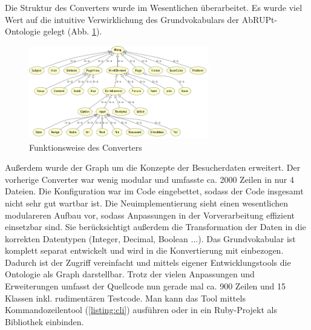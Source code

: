 \documentclass[runningheads,a4paper]{llncs}
\begin{document}
Die Struktur des Converters wurde im Wesentlichen überarbeitet.
Es wurde viel Wert auf die intuitive Verwirklichung des Grundvokabulars der AbRUPt-Ontologie gelegt (Abb. \ref{fig:onto}).

\begin{figure}
\centering
\includegraphics[width=0.7\textwidth]{figures/tbox}
\caption{Funktionsweise des Converters}
\label{fig:onto}
\end{figure}

Außerdem wurde der Graph um die Konzepte der Besucherdaten erweitert.
Der vorherige Converter war wenig modular und umfasste ca. 2000 Zeilen in nur 4 Dateien.
Die Konfiguration war im Code eingebettet, sodass der Code insgesamt nicht sehr gut wartbar ist.
Die Neuimplementierung sieht einen wesentlichen modulareren Aufbau vor, sodass Anpassungen in der Vorverarbeitung effizient einsetzbar sind.
Sie berücksichtigt außerdem die Transformation der Daten in die korrekten Datentypen (Integer, Decimal, Boolean ...).
Das Grundvokabular ist komplett separat entwickelt und wird in die Konvertierung mit einbezogen.
Dadurch ist der Zugriff vereinfacht und mittels eigener Entwicklungstools die Ontologie als Graph darstellbar.
Trotz der vielen Anpassungen und Erweiterungen umfasst der Quellcode nun gerade mal ca. 900 Zeilen und 15 Klassen inkl. rudimentären Testcode.
Man kann das Tool mittels Kommandozeilentool (\ref{listing:cli}) ausführen oder in ein Ruby-Projekt als Bibliothek einbinden.


\end{document}
